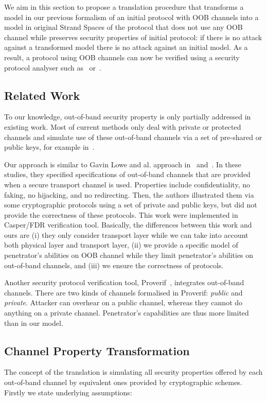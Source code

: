 We aim in this section to propose a translation procedure that transforms a model in our previous formalism of an initial protocol with OOB channels into a model in original Strand Spaces of the protocol that does not use any OOB channel while preserves security properties of initial protocol: if there is no attack against a transformed model there is no attack against an initial model. As a result, a protocol using OOB channels can now be verified using a security protocol analyser such as~\cite{596779} or~\cite{BlanchetCSFW01}.

\subsection{Related Work}

To our knowledge, out-of-band security property is only partially addressed in existing work. Most of current methods only deal with private or protected channels and simulate use of these out-of-band channels via a set of pre-shared or public keys, for example in~\cite{Diaz2014149, Han:2014:SPM:2627393.2627400, Bella:2003aa}.

Our approach is similar to Gavin Lowe and al. approach in~\cite{cdilloway2007spec} and~\cite{Kamil:2011aa}. In these studies, they specified specifications of out-of-band channels that are provided when a secure transport channel is used. Properties include confidentiality, no faking, no hijacking, and no redirecting. Then, the authors illustrated them via some cryptographic protocols using a set of private and public keys, but did not provide the correctness of these protocols. This work were implemented in Casper/FDR verification tool\cite{596779}. Basically, the differences between this work and ours are (i) they only consider transport layer while we can take into account both physical layer and transport layer, (ii) we provide a specific model of penetrator's abilities on OOB channel while they limit penetrator's abilities on out-of-band channels, and (iii) we ensure the correctness of protocols.

Another security protocol verification tool, Proverif~\cite{BlanchetCSFW01}, integrates out-of-band channels.
There are two kinds of channels formalised in Proverif: \emph{public} and \emph{private}. Attacker can overhear on a public channel, whereas they cannot do anything on a private channel. Penetrator's capabilities are thus more limited than in our model.

\subsection{Channel Property Transformation}\label{OOB-transform}
The concept of the translation is simulating all security properties offered by each out-of-band channel by equivalent ones provided by cryptographic schemes. Firstly we state underlying assumptions:

